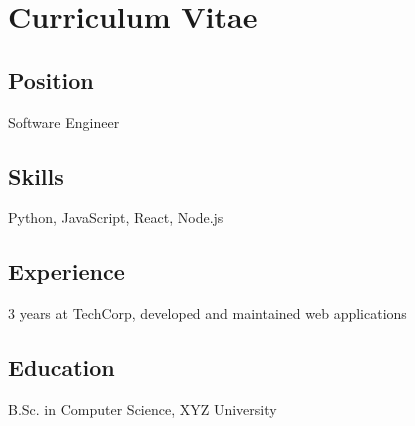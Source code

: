 \documentclass[12pt]{article}
\begin{document}
\section*{Curriculum Vitae}

\subsection*{\Large \textbf{Position}}
Software Engineer

\subsection*{\large \textbf{Skills}}
Python, JavaScript, React, Node.js

\subsection*{\large \textbf{Experience}}
3 years at TechCorp, developed and maintained web applications

\subsection*{\large \textbf{Education}}
B.Sc. in Computer Science, XYZ University
\end{document}
